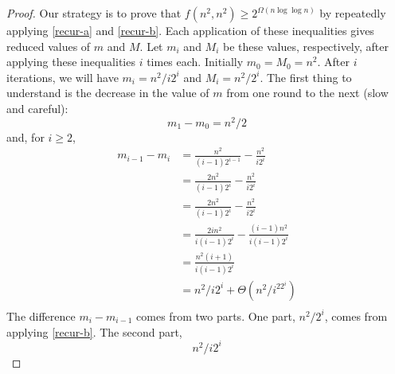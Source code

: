 \documentclass{patmorin}
\begin{document}
\begin{proof}
Our strategy is to prove that $f(n^2,n^2) \ge 2^{\Omega(n\log\log n)}$ by
repeatedly applying \eqref{recur-a} and \eqref{recur-b}.  Each application of
these inequalities gives reduced values of $m$ and $M$.  Let $m_i$ and $M_i$ be
these values, respectively, after applying these inequalities $i$ times each.  Initially $m_0=M_0=n^2$.  After $i$ iterations, we will have $m_i=n^2/i2^i$ and $M_i=n^2/2^i$.  The first thing to understand is the decrease in the value of $m$ from one round to the next (slow and careful):
\[
    m_1 - m_0 = n^2/2
\]
and, for $i \ge 2$, 
\begin{align*}
  m_{i-1}-m_i
      & = \frac{n^2}{(i-1)2^{i-1}} - \frac{n^2}{i2^{i}} \\
      & = \frac{2n^2}{(i-1)2^{i}} - \frac{n^2}{i2^{i}} \\
      & = \frac{2n^2}{(i-1)2^{i}} - \frac{n^2}{i2^{i}} \\
      & = \frac{2in^2}{i(i-1)2^{i}} - \frac{(i-1)n^2}{i(i-1)2^{i}} \\
      & = \frac{n^2(i+1)}{i(i-1)2^{i}} \\
      & = n^2/i2^i + \Theta(n^2/i^22^i)\\
\end{align*}
The difference $m_i-m_{i-1}$ comes from two parts.  One part, $n^2/2^i$,
comes from applying \eqref{recur-b}.  The second part,
\[
     n^2/i2^i 
\]

\end{proof}
\end{document}
